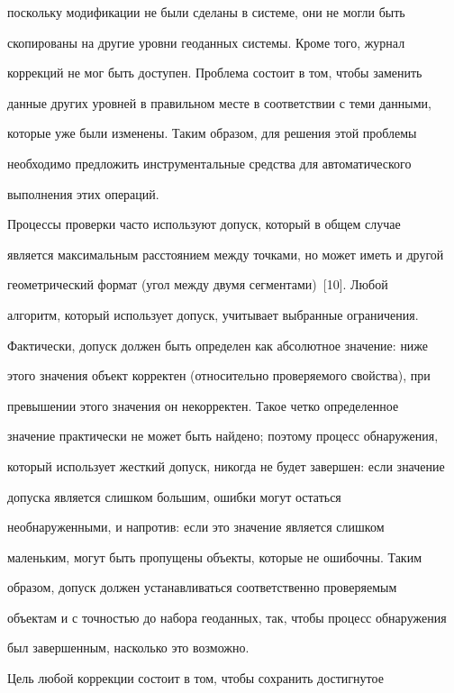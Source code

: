 поскольку модификации не были сделаны в системе, они не могли быть 


скопированы на другие уровни геоданных системы. Кроме того, журнал 


коррекций не мог быть доступен. Проблема состоит в том, чтобы заменить 


данные других уровней в правильном месте в соответствии с теми данными, 


которые уже были изменены. Таким образом, для решения этой проблемы 


необходимо предложить инструментальные средства для автоматического 


выполнения этих операций.


    


    Процессы проверки часто используют допуск, который в общем случае 


является максимальным расстоянием между точками, но может иметь и другой 


геометрический формат (угол между двумя сегментами)~[10]. Любой 


алгоритм, который использует допуск, учитывает выбранные ограничения. 


Фактически, допуск должен быть определен как абсолютное значение: ниже 


этого значения объект корректен (относительно проверяемого свойства), при 


превышении этого значения он некорректен. Такое четко определенное 


значение практически не может быть найдено; поэтому процесс обнаружения, 


который использует жесткий допуск, никогда не будет завершен: если значение 


допуска является слишком большим, ошибки могут остаться 


необнаруженными, и напротив: если это значение является слишком 


маленьким, могут быть пропущены объекты, которые не ошибочны. Таким 


образом, допуск должен устанавливаться соответственно проверяемым 


объектам и с точностью до набора геоданных, так, чтобы процесс обнаружения 


был завершенным, насколько это возможно. 


    


    Цель любой коррекции состоит в том, чтобы сохранить достигнутое 


